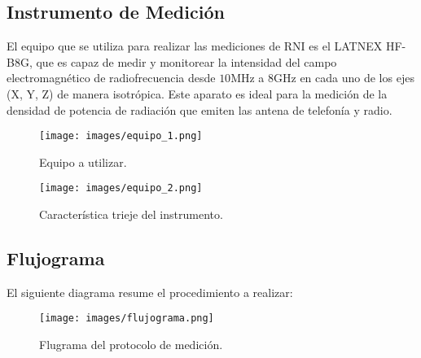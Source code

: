 \subsection*{Instrumento de Medición}
El equipo que se utiliza para realizar las mediciones de RNI es el LATNEX HF-B8G, que es capaz de medir y monitorear la intensidad del campo electromagnético de radiofrecuencia desde $10$MHz a $8$GHz en cada uno de los ejes (X, Y, Z) de manera isotrópica. Este aparato es ideal para la medición de la densidad de potencia de radiación que emiten las antena de telefonía y radio.


\begin{figure}[H]
\centering
\texttt{[image: images/equipo\_1.png]}
\caption{Equipo a utilizar.}
\label{2.2}
\end{figure}


\begin{figure}[H]
\centering
\texttt{[image: images/equipo\_2.png]}
\caption{Característica trieje del instrumento.}
\label{2.3}
\end{figure}


\subsection*{Flujograma}
El siguiente diagrama resume el procedimiento a realizar:

\begin{figure}[H]
\centering
\texttt{[image: images/flujograma.png]}
\caption{Flugrama del protocolo de medición.}
\label{2.4}
\end{figure}

